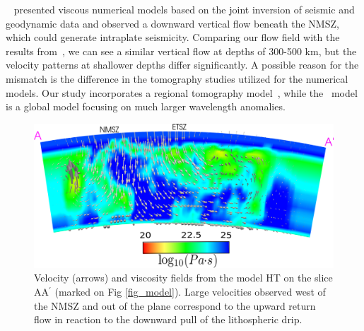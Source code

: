 \documentclass[draft,linenumbers]{agujournal2018}
\begin{document}
~\citet{forte2007descent} presented viscous numerical models based on the joint inversion of seismic and geodynamic data and observed a downward vertical flow beneath the NMSZ, which could generate intraplate seismicity. Comparing our flow field with the results from~\citet{forte2007descent}, we can see a similar vertical flow at depths of 300-500 km, but the velocity patterns at shallower depths differ significantly. A possible reason for the mismatch is the difference in the tomography studies utilized for the numerical models. Our study incorporates a regional tomography model~\citep{Biryol_2016}, while the~\citet{forte2007descent} model is a global model focusing on much larger wavelength anomalies.
%    
\begin{figure}[ht]
    \centering
    \includegraphics[width=0.9\linewidth]{figures/velocity_pattern.png}
    \caption{Velocity (arrows) and viscosity fields from the model HT on the slice AA$^{\prime}$ (marked on Fig \ref{fig_model}). Large velocities observed west of the NMSZ and out of the plane correspond to the upward return flow in reaction to the downward pull of the lithospheric drip. %
}
    \label{velocity_pattern}
\end{figure}     
\end{document}
